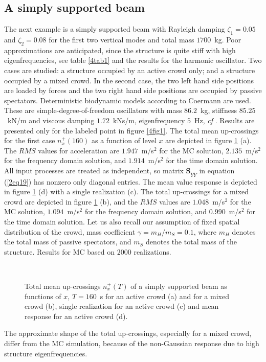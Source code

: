 \documentclass[preprint,12pt,authoryear]{elsarticle}
\newcommand{\bs}[1]{{\boldsymbol{#1}}}
\begin{document}
\subsection{A simply supported beam}
\label{beam}
The next example is a simply supported beam with Rayleigh damping $\zeta_1=0.05$ and $\zeta_2=0.08$ for the first two vertical modes and total mass $1700$~kg. Poor approximations are anticipated, since the structure is quite stiff with high eigenfrequencies, see table \ref{4tab1} and the results for the harmonic oscillator. Two cases are studied: a structure occupied by an active crowd only; and a structure occupied by a mixed crowd. In the second case, the two left hand side positions are loaded by forces and the two right hand side positions are occupied by passive spectators. Deterministic biodynamic models according to Coermann are used. These are simple-degree-of-freedom oscillators with mass $86.2$~kg, stiffness $85.25$~kN/m and viscous damping $1.72$~kNs/m, eigenfrequency $5$~Hz, \textit{cf} \citep{Sachse}. Results are presented only for the labeled point in figure \ref{4fig1}. The total mean up-crossings for the first case $n_x^+(160)$ as a function of level $x$ are depicted in figure \ref{4fig4} (a). The $RMS$ values for acceleration are $1.947$~m/s$^2$ for the MC solution, $2.135$~m/s$^2$ for the frequency domain solution, and $1.914$~m/s$^2$ for the time domain solution. All input processes are treated as independent, so matrix $\bs{S}_{\tilde{Y}\tilde{Y}}$ in equation (\ref{2eq19}) has nonzero only diagonal entries. The mean value response is depicted in figure \ref{4fig4} (d) with a single realization (c). The total up-crossings for a mixed crowd are depicted in figure \ref{4fig4} (b), and the $RMS$ values are $1.048$~m/s$^2$ for the MC solution, $1.094$~m/s$^2$ for the frequency domain solution, and $0.990$~m/s$^2$ for the time domain solution. Let us also recall our assumption of fixed spatial distribution of the crowd, mass coefficient $\gamma=m_H/m_S=0.1$, where $m_H$ denotes the total mass of passive spectators, and $m_S$ denotes the total mass of the structure. Results for MC based on $2000$ realizations.
\begin{figure}
	\centering
{}
\\
	\caption{Total mean up-crossings $n_x^+(T)$ of a simply supported beam as functions of $x$, $T=160$~s for an active crowd (a) and for a mixed crowd (b), single realization for an active crowd (c) and mean response for an active crowd (d).}
	\label{4fig4}
\end{figure}
The approximate shape of the total up-crossings, especially for a mixed crowd, differ from the MC simulation, because of the non-Gaussian response due to high structure eigenfrequencies.
\end{document}
